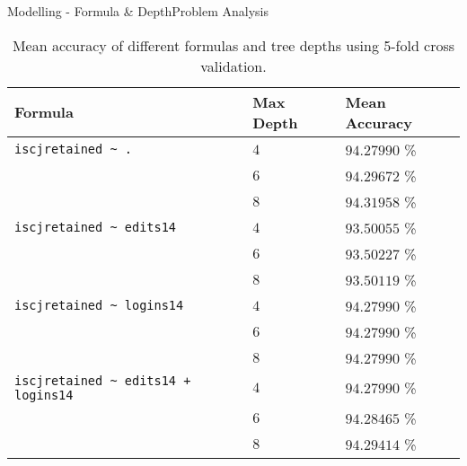 \documentclass[12pt,aspectratio=1610]{beamer}
\begin{document}
\begin{frame}{Modelling - Formula \& Depth}{Problem Analysis}
	\begin{table}[H]
	    \centering
	    \begin{tabular}{l|l|l}
	        \textbf{Formula}                              & \textbf{Max Depth} & \textbf{Mean Accuracy} \\ \hline
	        \texttt{iscjretained \~{} .}                  & $4$                & $94.27990$ \%          \\
	                                                      & $6$                & $94.29672$ \%          \\ %
	                                                      & $8$                & $94.31958$ \%          \\ \hline %
	        \texttt{iscjretained \~{} edits14}            & $4$                & $93.50055$ \%          \\
	                                                      & $6$                & $93.50227$ \%          \\
	                                                      & $8$                & $93.50119$ \%          \\ \hline
	        \texttt{iscjretained \~{} logins14}           & $4$                & $94.27990$ \%          \\
	                                                      & $6$                & $94.27990$ \%          \\
	                                                      & $8$                & $94.27990$ \%          \\ \hline
	        \texttt{iscjretained \~{} edits14 + logins14} & $4$                & $94.27990$ \%          \\
	                                                      & $6$                & $94.28465$ \%          \\
	                                                      & $8$                & $94.29414$ \%
	    \end{tabular}
	    \caption{Mean accuracy of different formulas and tree depths using 5-fold cross
	        validation.}
	    \label{tab:formulacompare}
	\end{table}
\end{frame}
\end{document}
